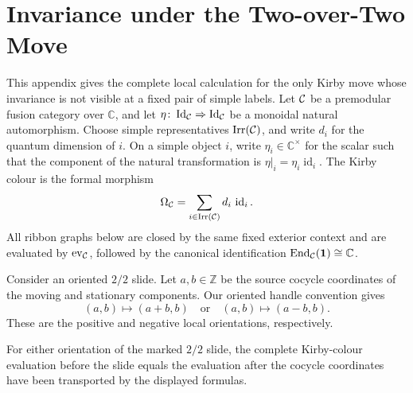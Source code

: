 \section{Invariance under the Two-over-Two Move}
\label{app:two-over-two-invariance}

This appendix gives the complete local calculation for the only Kirby move
whose invariance is not visible at a fixed pair of simple labels.  Let
\(\mathcal{C}\) be a premodular fusion category over \(\mathbb C\), and let
\(\eta\colon\operatorname{Id}_{\mathcal{C}}\Rightarrow
\operatorname{Id}_{\mathcal{C}}\) be a monoidal natural automorphism.  Choose simple
representatives \(\operatorname{Irr}(\mathcal{C})\), and write \(d_i\) for the quantum
dimension of \(i\).  On a simple object \(i\), write
\(\eta_i\in\mathbb C^\times\) for the scalar such that the component of the
natural transformation is \(\eta|_i=\eta_i\operatorname{id}_i\).  The Kirby
colour is the formal morphism
\[
  \Omega_{\mathcal{C}}
  =\sum_{i\in\operatorname{Irr}(\mathcal{C})}
    d_i\,\operatorname{id}_i.
\]
All ribbon graphs below are closed by the same fixed exterior context and
are evaluated by \(\operatorname{ev}_{\mathcal{C}}\), followed by the canonical
identification
\(\operatorname{End}_{\mathcal{C}}(\mathbf1)\cong\mathbb C\).

Consider an oriented \(2/2\) slide.  Let \(a,b\in\mathbb Z\) be the source
cocycle coordinates of the moving and stationary components.  Our oriented
handle convention gives
\[
  (a,b)\longmapsto(a+b,b)
  \quad\text{or}\quad
  (a,b)\longmapsto(a-b,b).
\]
These are the positive and negative local orientations, respectively.

\begin{lemma}
\label{lem:character-decorated-two-over-two-slide}
For either orientation of the marked \(2/2\) slide, the complete
Kirby-colour evaluation before the slide equals the evaluation after the
cocycle coordinates have been transported by the displayed formulas.
\end{lemma}

